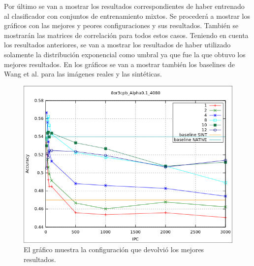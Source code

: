	Por último se van a mostrar los resultados correspondientes de haber entrenado al clasificador con conjuntos de entrenamiento mixtos. Se procederá a mostrar los gráficos con las mejores y peores configuraciones y sus resultados. También se mostrarán las matrices de correlación para todos estos casos. Teniendo en cuenta los resultados anteriores, se van a mostrar los resultados de haber utilizado solamente la distribución exponencial como umbral ya que fue la que obtuvo los mejores resultados. En los gráficos  se van a mostrar también los baselines de Wang et al. para las imágenes reales y las sintéticas.
	
			\begin{figure}[htbp]
				\centering
				\includegraphics[scale=0.6]{img/resultados/mixtas/best_expon_8or3cpb_Alpha0,1_4080.png}
				\caption[Mixtas expon mejor resultado]{El gráfico muestra la configuración que devolvió los mejores resultados.}
				\label{fig: Mixtas-expon-mejor}
			\end{figure}

